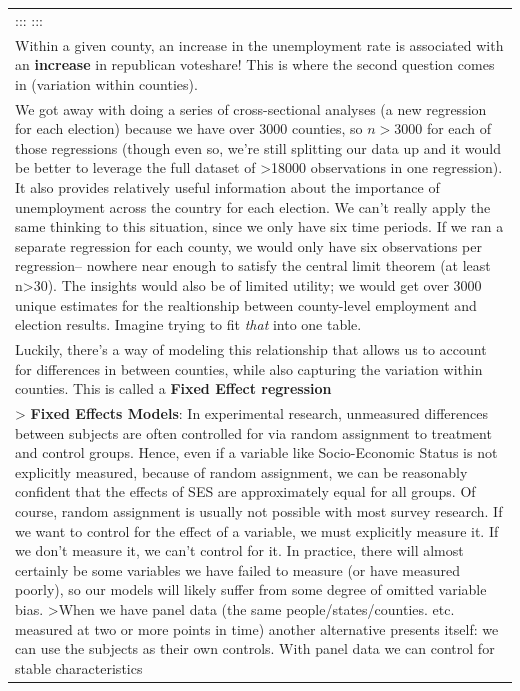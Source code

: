 \documentclass[
  letterpaper,
  DIV=11,
  numbers=noendperiod]{scrreprt}
\begin{document}
\begin{longtable}[]{@{}
  >{\raggedright\arraybackslash}p{}@{}}
::: ::: \\
Within a given county, an increase in the unemployment rate is
associated with an \textbf{increase} in republican voteshare! This is
where the second question comes in (variation within counties). \\
We got away with doing a series of cross-sectional analyses (a new
regression for each election) because we have over 3000 counties, so
\(n>3000\) for each of those regressions (though even so, we're still
splitting our data up and it would be better to leverage the full
dataset of \textgreater18000 observations in one regression). It also
provides relatively useful information about the importance of
unemployment across the country for each election. We can't really apply
the same thinking to this situation, since we only have six time
periods. If we ran a separate regression for each county, we would only
have six observations per regression-- nowhere near enough to satisfy
the central limit theorem (at least n\textgreater30). The insights would
also be of limited utility; we would get over 3000 unique estimates for
the realtionship between county-level employment and election results.
Imagine trying to fit \emph{that} into one table. \\
Luckily, there's a way of modeling this relationship that allows us to
account for differences in between counties, while also capturing the
variation within counties. This is called a \textbf{Fixed Effect
regression} \\
\textgreater{} \textbf{Fixed Effects Models}: In experimental research,
unmeasured differences between subjects are often controlled for via
random assignment to treatment and control groups. Hence, even if a
variable like Socio-Economic Status is not explicitly measured, because
of random assignment, we can be reasonably confident that the effects of
SES are approximately equal for all groups. Of course, random assignment
is usually not possible with most survey research. If we want to control
for the effect of a variable, we must explicitly measure it. If we don't
measure it, we can't control for it. In practice, there will almost
certainly be some variables we have failed to measure (or have measured
poorly), so our models will likely suffer from some degree of omitted
variable bias. \textgreater When we have panel data (the same
people/states/counties. etc. measured at two or more points in time)
another alternative presents itself: we can use the subjects as their
own controls. With panel data we can control for stable characteristics

\end{longtable}
\end{document}
